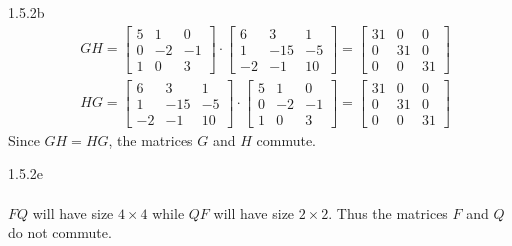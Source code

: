 \documentclass{article}
\theoremstyle{definition}
\begin{document}
	\begin{prob}{1.5.2b}
		\begin{align*}
			&GH = \begin{bmatrix} 5 & 1 & 0 \\ 0 & -2 & -1 \\ 1 & 0 & 3 \end{bmatrix} \cdot \begin{bmatrix} 6 & 3 & 1 \\ 1 & -15 & -5 \\ -2 & -1 & 10 \end{bmatrix} = \begin{bmatrix} 31 & 0 & 0 \\ 0 & 31 & 0 \\ 0 & 0 & 31 \end{bmatrix} \\
			&HG = \begin{bmatrix} 6 & 3 & 1 \\ 1 & -15 & -5 \\ -2 & -1 & 10 \end{bmatrix} \cdot \begin{bmatrix} 5 & 1 & 0 \\ 0 & -2 & -1 \\ 1 & 0 & 3 \end{bmatrix} = \begin{bmatrix} 31 & 0 & 0 \\ 0 & 31 & 0 \\ 0 & 0 & 31 \end{bmatrix}
		\end{align*}
		Since $ GH = HG $, the matrices $ G $ and $ H $ commute. \vspace{1mm}
	\end{prob}
	
	
	\begin{prob}{1.5.2e} $  $ \\ \\
		$ FQ $ will have size $ 4 \times 4 $ while $ QF $ will have size $ 2 \times 2 $. Thus the matrices $ F $ and $ Q $ do not commute. \vspace{1mm}
	\end{prob}
\end{document}
